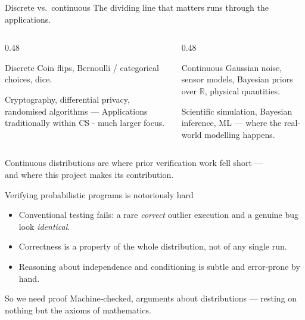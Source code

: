 \begin{frame}{Discrete vs.\ continuous}
  The dividing line that matters runs through the \alert{applications}.
  \medskip

  \begin{columns}[T]
    \begin{column}{0.48\textwidth}
      \begin{block}{Discrete}
        Coin flips, Bernoulli / categorical choices, dice.
        \medskip

        Cryptography, differential privacy, randomised algorithms ---
        Applications traditionally within CS - much larger focus.
      \end{block}
    \end{column}
    \begin{column}{0.48\textwidth}
      \begin{block}{Continuous}
        Gaussian noise, sensor models, Bayesian priors over $\mathbb{R}$,
        physical quantities.
        \medskip

        Scientific simulation, Bayesian inference, ML --- where the
        \alert{real-world modelling} happens.
      \end{block}
    \end{column}
  \end{columns}

  \vfill
  \begin{center}
    Continuous distributions are where prior verification work fell short ---\\
    and where this project makes its  contribution.
  \end{center}
\end{frame}

\begin{frame}{Verifying probabilistic programs is notoriously hard}
  \begin{itemize}
    \item Conventional \alert{testing fails}: a rare \emph{correct} outlier
          execution and a genuine bug look \emph{identical}.
    \item Correctness is a property of the whole \alert{distribution}, not of
          any single run.
    \item Reasoning about \alert{independence} and conditioning is subtle and
          error-prone by hand.
  \end{itemize}
  \pause
  \begin{block}{So we need proof}
    Machine-checked,  arguments about distributions ---
    resting on nothing but the axioms of mathematics.
  \end{block}
\end{frame}
